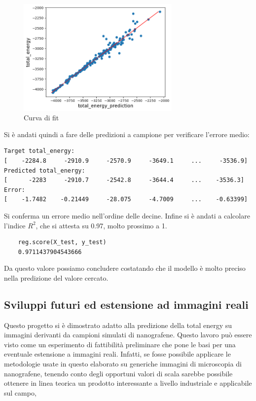 \documentclass[12pt,a4paper,openright,twoside]{report}
\begin{document}
\begin{center}
\begin{figure}[h]
\centering
\includegraphics[width=300px,keepaspectratio]{fit.png}
\caption{Curva di fit}
\end{figure}    
\end{center} 

Si è andati quindi a fare delle predizioni a campione per verificare l'errore medio: 
\begin{verbatim}
Target total_energy: 
[    -2284.8     -2910.9     -2570.9     -3649.1     ...     -3536.9]
Predicted total_energy: 
[      -2283     -2910.7     -2542.8     -3644.4     ...    -3536.3]
Error: 
[    -1.7482    -0.21449     -28.075     -4.7009     ...    -0.63399]
\end{verbatim}

Si conferma un errore medio nell’ordine delle decine. 
\newpage
Infine si è andati a calcolare l'indice $R^2$, che si attesta su 0.97, molto prossimo a 1.  
\begin{verbatim}
    reg.score(X_test, y_test)
    0.9711437904543666
\end{verbatim}
Da questo valore possiamo concludere costatando che il modello è molto preciso nella predizione del valore cercato.
\subsection{Sviluppi futuri ed estensione ad immagini reali}
Questo progetto si è dimostrato adatto alla predizione della total energy su immagini derivanti da campioni simulati di nanografene. Questo lavoro può essere visto come un esperimento di fattibilità preliminare che pone le basi per una eventuale estensione a immagini reali. 
Infatti, se fosse possibile applicare le metodologie usate in questo elaborato su generiche immagini di microscopia di nanografene, tenendo conto degli opportuni valori di scala sarebbe possibile ottenere in linea teorica un prodotto interessante a livello industriale e applicabile sul campo, 
\end{document}
